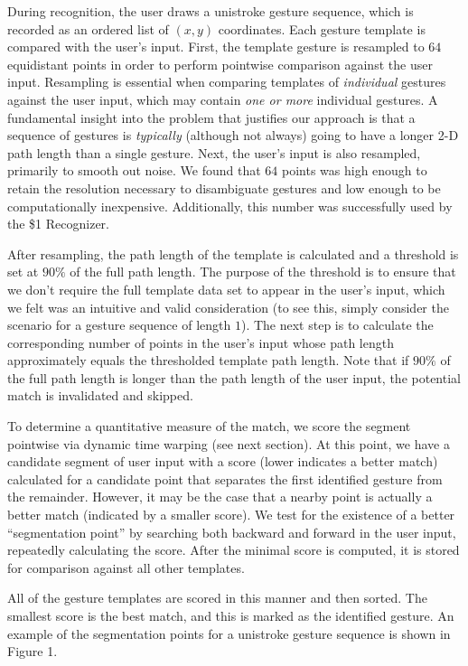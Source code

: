 \documentclass[twoside]{article}
\begin{document}
\begin{multicols}{2}
During recognition, the user draws a unistroke gesture sequence, which is
recorded as an ordered list of $(x,y)$ coordinates. Each gesture template is
compared with the user's input. First, the template gesture is resampled to $64$
equidistant points in order to perform pointwise comparison against the user
input. Resampling is essential when comparing templates of \emph{individual}
gestures against the user input, which may contain \emph{one or more} individual
gestures. A fundamental insight into the problem that justifies our approach is
that a sequence of gestures is \emph{typically} (although not always) going to
have a longer 2-D path length than a single gesture. Next, the user's input is
also resampled, primarily to smooth out noise. We found that $64$ points was
high enough to retain the resolution necessary to disambiguate gestures and low
enough to be computationally inexpensive. Additionally, this number was
successfully used by the \$1 Recognizer\cite{wobbrock2007gestures}.

After resampling, the path length of the template is calculated and a threshold
is set at $90\%$ of the full path length. The purpose of the threshold is to
ensure that we don't require the full template data set to appear in the user's
input, which we felt was an intuitive and valid consideration (to see this,
simply consider the scenario for a gesture sequence of length $1$). The next
step is to calculate the corresponding number of points in the user's input
whose path length approximately equals the thresholded template path length.
Note that if $90\%$ of the full path length is longer than the path length of
the user input, the potential match is invalidated and skipped.

To determine a quantitative measure of the match, we score the segment pointwise
via dynamic time warping (see next section). At this point, we have a candidate
segment of user input with a score (lower indicates a better match) calculated
for a candidate point that separates the first identified gesture from the
remainder. However, it may be the case that a nearby point is actually a better
match (indicated by a smaller score). We test for the existence of a better
``segmentation point'' by searching both backward and forward in the user input,
repeatedly calculating the score. After the minimal score is computed, it is
stored for comparison against all other templates.

All of the gesture templates are scored in this manner and then sorted. The
smallest score is the best match, and this is marked as the identified gesture. An example
of the segmentation points for a unistroke gesture sequence is shown in Figure 1.


\end{multicols}
\end{document}
